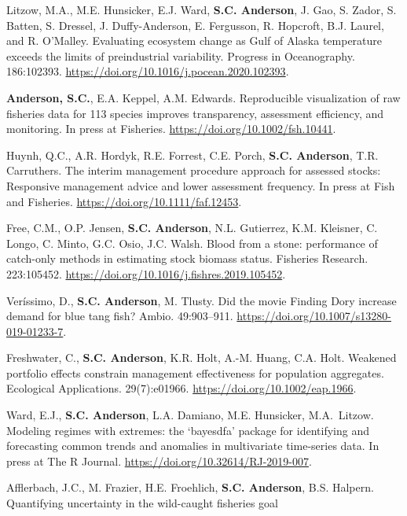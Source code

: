 \begin{description}
\tightlist
\item[2020]
Litzow, M.A., M.E. Hunsicker, E.J. Ward, \textbf{S.C. Anderson}, J. Gao,
S. Zador, S. Batten, S. Dressel, J. Duffy-Anderson, E. Fergusson, R.
Hopcroft, B.J. Laurel, and R. O'Malley. Evaluating ecosystem change as
Gulf of Alaska temperature exceeds the limits of preindustrial
variability. Progress in Oceanography. 186:102393.
\url{https://doi.org/10.1016/j.pocean.2020.102393}.
\item[2020]
\textbf{Anderson, S.C.}, E.A. Keppel, A.M. Edwards. Reproducible
visualization of raw fisheries data for 113 species improves
transparency, assessment efficiency, and monitoring. In press at
Fisheries. \url{https://doi.org/10.1002/fsh.10441}.
\item[2020]
Huynh, Q.C., A.R. Hordyk, R.E. Forrest, C.E. Porch, \textbf{S.C.
Anderson}, T.R. Carruthers. The interim management procedure approach
for assessed stocks: Responsive management advice and lower assessment
frequency. In press at Fish and Fisheries.
\url{https://doi.org/10.1111/faf.12453}.
\item[2020]
Free, C.M., O.P. Jensen, \textbf{S.C. Anderson}, N.L. Gutierrez, K.M.
Kleisner, C. Longo, C. Minto, G.C. Osio, J.C. Walsh. Blood from a stone:
performance of catch-only methods in estimating stock biomass status.
Fisheries Research. 223:105452.
\url{https://doi.org/10.1016/j.fishres.2019.105452}.
\item[2020]
Veríssimo, D., \textbf{S.C. Anderson}, M. Tlusty. Did the movie Finding
Dory increase demand for blue tang fish? Ambio. 49:903--911.
\url{https://doi.org/10.1007/s13280-019-01233-7}.
\item[2019]
Freshwater, C., \textbf{S.C. Anderson}, K.R. Holt, A.-M. Huang, C.A.
Holt. Weakened portfolio effects constrain management effectiveness for
population aggregates. Ecological Applications. 29(7):e01966.
\url{https://doi.org/10.1002/eap.1966}.
\item[2019]
Ward, E.J., \textbf{S.C. Anderson}, L.A. Damiano, M.E. Hunsicker,
M.A.\ Litzow. Modeling regimes with extremes: the `bayesdfa' package for
identifying and forecasting common trends and anomalies in multivariate
time-series data. In press at The R Journal.
\href{https://journal.r-project.org/archive/2019/RJ-2019-007/RJ-2019-007.pdf}{https://doi.org/10.32614/RJ-2019-007}.
\item[2019]
Afflerbach, J.C., M. Frazier, H.E. Froehlich, \textbf{S.C. Anderson},
B.S. Halpern. Quantifying uncertainty in the wild-caught fisheries goal

\end{description}
